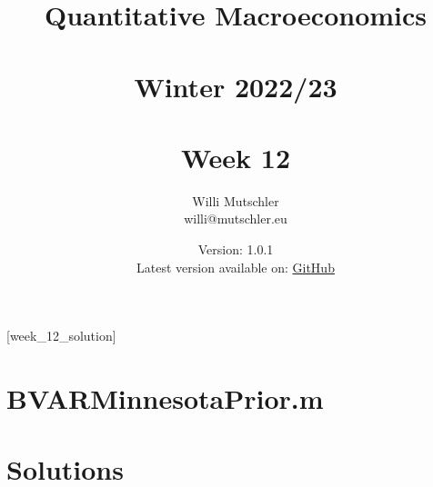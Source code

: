 
\newif\ifDisplaySolutions\DisplaySolutionstrue


\title{Quantitative Macroeconomics\\~\\Winter 2022/23\\~\\Week 12}
\author{Willi Mutschler\\willi@mutschler.eu}
\date{Version: 1.0.1\\Latest version available on: \href{https://github.com/wmutschl/Quantitative-Macroeconomics/releases/latest/download/week_12.pdf}{GitHub}}
\maketitle\thispagestyle{empty}

\newpage
{}[week_12_solution]
\tableofcontents\thispagestyle{empty}\newpage

\setcounter{page}{1}
\newpage
\newpage
\printbibliography
\newpage
\appendix
\section{BVARMinnesotaPrior.m}


\ifDisplaySolutions
\newpage

\section{Solutions}

\fi
